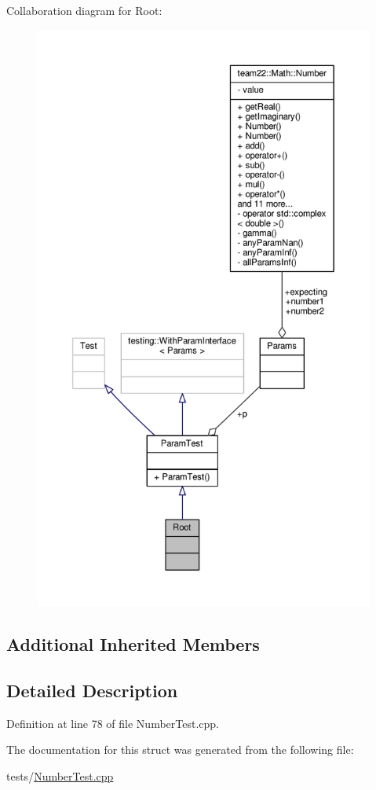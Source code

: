 Collaboration diagram for Root\+:
\nopagebreak
\begin{figure}[H]
\begin{center}
\leavevmode
\includegraphics[height=550pt]{struct_root__coll__graph}
\end{center}
\end{figure}
\subsection*{Additional Inherited Members}


\subsection{Detailed Description}


Definition at line 78 of file Number\+Test.\+cpp.



The documentation for this struct was generated from the following file\+:\begin{DoxyCompactItemize}
\item 
tests/\hyperlink{_number_test_8cpp}{Number\+Test.\+cpp}\end{DoxyCompactItemize}
